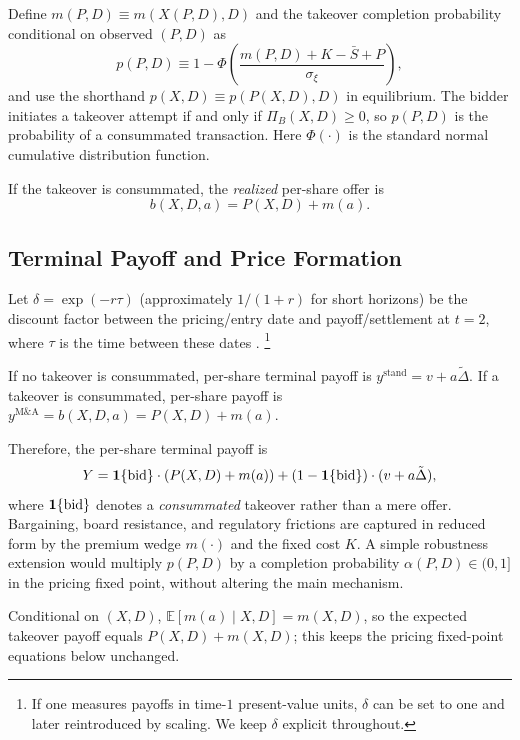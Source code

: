 \documentclass[11pt]{article}
\newcommand{\E}{\mathbb{E}}
\newcommand{\1}{\mathbf{1}}
\begin{document}
Define $m(P,D)\equiv m(X(P,D),D)$ and the takeover completion probability conditional on observed $(P,D)$ as
\begin{equation}
p(P,D) \equiv 1 - \Phi\left(\frac{m(P,D) + K - \bar{S} + P}{\sigma_\xi}\right),
\label{eq:bid-prob}
\end{equation}
and use the shorthand $p(X,D)\equiv p(P(X,D),D)$ in equilibrium. The bidder initiates a takeover attempt if and only if $\Pi_B(X,D) \geq 0$, so $p(P,D)$ is the probability of a consummated transaction.
Here $\Phi(\cdot)$ is the standard normal cumulative distribution function.

If the takeover is consummated, the \emph{realized} per-share offer is
\[
b(X,D,a) = P(X,D) + m(a).
\]

\subsection{Terminal Payoff and Price Formation}

Let $\delta = \exp(-r\tau)$ (approximately $1/(1+r)$ for short horizons) be the discount factor between the pricing/entry date and payoff/settlement at $t=2$, where $\tau$ is the time between these dates \citep{Cochrane2005,Duffie2010}.%
\footnote{If one measures payoffs in time-$1$ present-value units, $\delta$ can be set to one and later reintroduced by scaling. We keep $\delta$ explicit throughout.}

If no takeover is consummated, per-share terminal payoff is $y^{\text{stand}} = v + a\tilde{\Delta}$. If a takeover is consummated, per-share payoff is $y^{\text{M\&A}} = b(X,D,a) = P(X,D) + m(a)$.

Therefore, the per-share terminal payoff is
\[
Y = \1\{\textup{bid}\} \cdot (P(X,D) + m(a)) + (1 - \1\{\textup{bid}\}) \cdot (v + a\tilde{\Delta}),
\]
where $\1\{\textup{bid}\}$ denotes a \emph{consummated} takeover rather than a mere offer. Bargaining, board resistance, and regulatory frictions are captured in reduced form by the premium wedge $m(\cdot)$ and the fixed cost $K$. A simple robustness extension would multiply $p(P,D)$ by a completion probability $\alpha(P,D)\in(0,1]$ in the pricing fixed point, without altering the main mechanism.

Conditional on $(X,D)$, $\E[m(a) \mid X,D]=m(X,D)$, so the expected takeover payoff equals $P(X,D)+m(X,D)$; this keeps the pricing fixed-point equations below unchanged.
\end{document}
